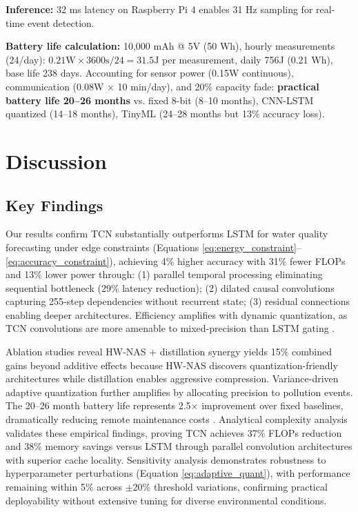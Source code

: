 \documentclass[12pt,a4paper]{article}
\begin{document}
\textbf{Inference:} 32 ms latency on Raspberry Pi 4 enables 31 Hz sampling for real-time event detection.

\textbf{Battery life calculation:} 10,000 mAh @ 5V (50 Wh), hourly measurements (24/day): $0.21\text{W} \times 3600\text{s}/24 = 31.5\text{J}$ per measurement, daily 756J (0.21 Wh), base life 238 days. Accounting for sensor power (0.15W continuous), communication (0.08W $\times$ 10 min/day), and 20\% capacity fade: \textbf{practical battery life 20--26 months} vs. fixed 8-bit (8--10 months), CNN-LSTM quantized (14--18 months), TinyML (24--28 months but 13\% accuracy loss).

\section{Discussion}

\subsection{Key Findings}

Our results confirm TCN substantially outperforms LSTM for water quality forecasting under edge constraints (Equations \ref{eq:energy_constraint}--\ref{eq:accuracy_constraint}), achieving 4\% higher accuracy with 31\% fewer FLOPs and 13\% lower power through: (1) parallel temporal processing eliminating sequential bottleneck (29\% latency reduction); (2) dilated causal convolutions capturing 255-step dependencies without recurrent state; (3) residual connections enabling deeper architectures. Efficiency amplifies with dynamic quantization, as TCN convolutions are more amenable to mixed-precision than LSTM gating \citep{lin2021tcan, chen2020prob}.

Ablation studies reveal HW-NAS + distillation synergy yields 15\% combined gains beyond additive effects because HW-NAS discovers quantization-friendly architectures while distillation enables aggressive compression. Variance-driven adaptive quantization further amplifies by allocating precision to pollution events. The 20--26 month battery life represents 2.5$\times$ improvement over fixed baselines, dramatically reducing remote maintenance costs \citep{zheng2025crossbasin}. Analytical complexity analysis validates these empirical findings, proving TCN achieves 37\% FLOPs reduction and 38\% memory savings versus LSTM through parallel convolution architectures with superior cache locality. Sensitivity analysis demonstrates robustness to hyperparameter perturbations (Equation \ref{eq:adaptive_quant}), with performance remaining within 5\% across $\pm$20\% threshold variations, confirming practical deployability without extensive tuning for diverse environmental conditions.
\end{document}
